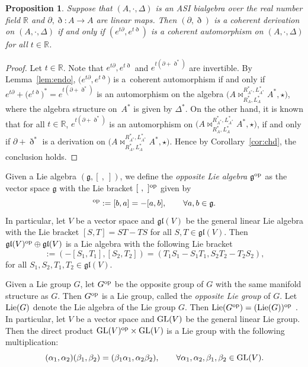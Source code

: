 \documentclass[pdftex]{sigma}
\numberwithin{equation}{section}
\newtheorem{Proposition}[Theorem]{Proposition}
{ \theoremstyle{definition}
	\newtheorem{Definition}[Theorem]{Definition}
	\newtheorem{Note}[Theorem]{Note}
	\newtheorem{Example}[Theorem]{Example}
	\newtheorem{Remark}[Theorem]{Remark} }
\begin{document}
\begin{Proposition}\label{pro:autder}
 Suppose that $(A,\cdot, \Delta)$ is an ASI bialgebra over the real number field $\mathbb{R}$ and $\partial, \eth\colon A \to A$ are linear maps.
 Then $(\partial, \eth)$ is a coherent derivation on $(A, \cdot, \Delta)$ if and only if $(e^{t\partial},e^{t\eth})$ is a coherent automorphism on $(A, \cdot, \Delta)$ for all $t \in \mathbb{R}$.
\end{Proposition}
\begin{proof}
Let $t \in \mathbb{R}$.
Note that $e^{t\partial}, e^{t\eth}$ and $e^{t (\partial + \eth^*)}$ are invertible.
By Lemma~\ref{lem:endo}, $\big(e^{t\partial}, e^{t\eth}\big)$ is a~coherent automorphism if and only if $e^{t\partial} + \big(e^{t\eth}\big)^* = e^{t(\partial + \eth^*)}$ is an automorphism on the algebra $\big(A \bowtie_{R_A^*, L_A^*}^{R_{A^*}^*, L_{A^*}^*} A^*, \star\big)$, where the algebra structure on~$A^*$ is given by $\Delta^*$.
On the other hand, it is known that for all $t \in \mathbb{R}$, $e^{t (\partial + \eth^*)}$ is an automorphism on $\big(A \bowtie_{R_A^*, L_A^*}^{R_{A^*}^*, L_{A^*}^*} A^*, \star\big)$,
if and only if $\partial + \eth^*$ is a derivation on $\big(A \bowtie_{R_A^*, L_A^*}^{R_{A^*}^*, L_{A^*}^*} A^*, \star\big)$.
Hence by Corollary~\ref{cor:chd}, the conclusion holds.
\end{proof}

Given a Lie algebra $(\mathfrak{g}, [\ ,\ ])$, we define the \textit{opposite Lie algebra} $\mathfrak{g}^{\rm op}$ as the vector space $\mathfrak{g}$ with the Lie bracket $[\ ,\ ]^{\rm op}$ given by
\begin{equation*}
 [a, b]^{\rm op} := [b, a] = -[a, b], \qquad \forall a, b \in \mathfrak{g}.
\end{equation*}
In particular, let $V$ be a vector space and $\mathfrak{gl}(V)$ be the general linear Lie algebra with the Lie bracket $[S, T] = S T - T S$ for all $S, T \in \mathfrak{gl}(V)$.
Then $\mathfrak{gl}(V)^{\rm op} \oplus \mathfrak{gl}(V)$ is a Lie algebra with the following Lie bracket
\begin{equation}
 [(S_1, S_2), (T_1, T_2)] := (-[S_1, T_1], [S_2, T_2]) = (T_1 S_1 - S_1 T_1, S_2 T_2 - T_2 S_2), \label{eq:coherent}
\end{equation}
for all $S_1, S_2, T_1, T_2 \in \mathfrak{gl}(V)$.

Given a Lie group $G$, let $G^{\rm op}$ be the opposite group of
$G$ with the same manifold structure as $G$. Then $G^{\rm op}$ is
a Lie group, called the \textit{opposite Lie group} of $G$. Let
${\rm Lie}(G)$ denote the Lie algebra of the Lie group $G$. Then
${\rm Lie}(G^{\rm op}) = ({\rm Lie}(G))^{\rm op}$ \cite{nicolas1989lie}.
In particular, let $V$ be a vector space and ${\rm GL}(V)$ be the general
linear Lie group. Then the direct product ${\rm GL}(V)^{\rm op} \times
{\rm GL}(V)$ is a Lie group with the following multiplication:
\begin{equation}
 (\alpha_1, \alpha_2) (\beta_1, \beta_2) = (\beta_1 \alpha_1, \alpha_2 \beta_2), \qquad \forall \alpha_1, \alpha_2, \beta_1, \beta_2 \in {\rm GL}(V). \label{eq:coherent2}
\end{equation}
\end{document}
